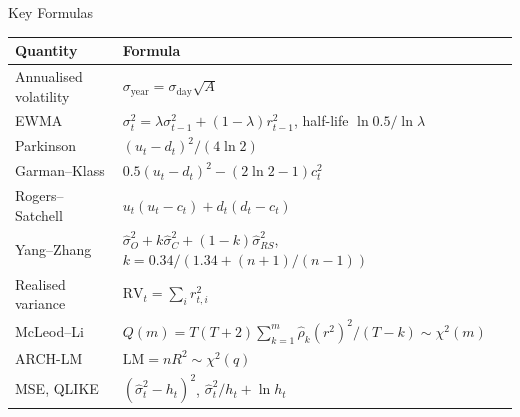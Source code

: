 \begin{frame}{Key Formulas}
\itemsize{\small}
{\renewcommand{\arraystretch}{1.4}\begin{center}
\small
\begin{tabular}{ll}
\toprule
\textbf{Quantity} & \textbf{Formula} \\
\midrule
Annualised volatility & $\sigma_{\text{year}} = \sigma_{\text{day}}\sqrt{A}$ \\
EWMA & $\sigma_t^2 = \lambda\sigma_{t-1}^2 + (1-\lambda)r_{t-1}^2$, \quad half-life $\ln 0.5/\ln\lambda$ \\
Parkinson & $(u_t - d_t)^2/(4\ln 2)$ \\
Garman--Klass & $0.5(u_t - d_t)^2 - (2\ln 2 - 1)c_t^2$ \\
Rogers--Satchell & $u_t(u_t - c_t) + d_t(d_t - c_t)$ \\
Yang--Zhang & $\hat\sigma_O^2 + k\hat\sigma_C^2 + (1-k)\hat\sigma_{RS}^2$, \quad $k = 0.34/(1.34 + (n+1)/(n-1))$ \\
Realised variance & $\mathrm{RV}_t = \sum_i r_{t,i}^2$ \\
McLeod--Li & $Q(m) = T(T+2)\sum_{k=1}^m \hat\rho_k(r^2)^2/(T-k) \sim \chi^2(m)$ \\
ARCH-LM & $\mathrm{LM} = nR^2 \sim \chi^2(q)$ \\
MSE, QLIKE & $(\hat\sigma_t^2 - h_t)^2$, \quad $\hat\sigma_t^2/h_t + \ln h_t$ \\
\bottomrule
\end{tabular}
\end{center}
}
\end{frame}

